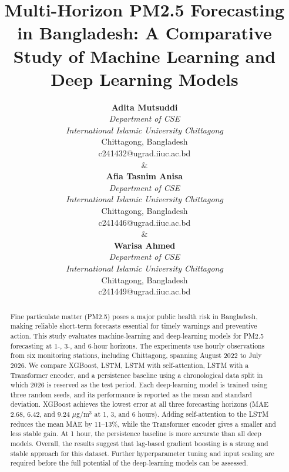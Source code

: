 \documentclass[conference]{IEEEtran}
\begin{document}
\title{Multi-Horizon PM2.5 Forecasting in Bangladesh: A Comparative Study of Machine Learning and Deep Learning Models}

\author{
\begin{tabular*}{\textwidth}{@{\extracolsep{\fill}}ccc}
\parbox[t]{0.30\textwidth}{\centering
\textbf{Adita Mutsuddi}\\
\textit{Department of CSE}\\
\textit{International Islamic University Chittagong}\\
Chittagong, Bangladesh\\
c241432@ugrad.iiuc.ac.bd
}
&
\parbox[t]{0.30\textwidth}{\centering
\textbf{Afia Tasnim Anisa}\\
\textit{Department of CSE}\\
\textit{International Islamic University Chittagong}\\
Chittagong, Bangladesh\\
c241446@ugrad.iiuc.ac.bd
}
&
\parbox[t]{0.30\textwidth}{\centering
\textbf{Warisa Ahmed}\\
\textit{Department of CSE}\\
\textit{International Islamic University Chittagong}\\
Chittagong, Bangladesh\\
c241449@ugrad.iiuc.ac.bd
}
\end{tabular*}
}

\maketitle

\begin{abstract}
Fine particulate matter (PM2.5) poses a major public health risk in Bangladesh, making reliable short-term forecasts essential for timely warnings and preventive action. This study evaluates machine-learning and deep-learning models for PM2.5 forecasting at 1-, 3-, and 6-hour horizons. The experiments use hourly observations from six monitoring stations, including Chittagong, spanning August 2022 to July 2026. We compare XGBoost, LSTM, LSTM with self-attention, LSTM with a Transformer encoder, and a persistence baseline using a chronological data split in which 2026 is reserved as the test period. Each deep-learning model is trained using three random seeds, and its performance is reported as the mean and standard deviation. XGBoost achieves the lowest error at all three forecasting horizons (MAE 2.68, 6.42, and 9.24 \(\mu\)g/m\(^3\) at 1, 3, and 6 hours). Adding self-attention to the LSTM reduces the mean MAE by 11--13\%, while the Transformer encoder gives a smaller and less stable gain. At 1 hour, the persistence baseline is more accurate than all deep models. Overall, the results suggest that lag-based gradient boosting is a strong and stable approach for this dataset. Further hyperparameter tuning and input scaling are required before the full potential of the deep-learning models can be assessed.
\end{abstract}
\end{document}
